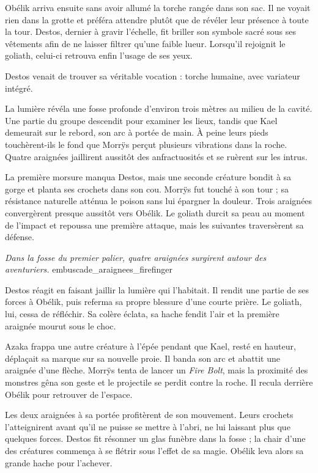 Obélik arriva ensuite sans avoir allumé la torche rangée dans son sac. Il ne voyait rien dans la grotte et préféra attendre plutôt que de révéler leur présence à toute la tour. Destos, dernier à gravir l'échelle, fit briller son symbole sacré sous ses vêtements afin de ne laisser filtrer qu'une faible lueur. Lorsqu'il rejoignit le goliath, celui-ci retrouva enfin l'usage de ses yeux.

\begin{narrateur}
Destos venait de trouver sa véritable vocation : torche humaine, avec variateur intégré.
\end{narrateur}

\scenebreak

La lumière révéla une fosse profonde d'environ trois mètres au milieu de la cavité. Une partie du groupe descendit pour examiner les lieux, tandis que Kael demeurait sur le rebord, son arc à portée de main. À peine leurs pieds touchèrent-ils le fond que Morrÿs perçut plusieurs vibrations dans la roche. Quatre araignées jaillirent aussitôt des anfractuosités et se ruèrent sur les intrus.

La première morsure manqua Destos, mais une seconde créature bondit à sa gorge et planta ses crochets dans son cou. Morrÿs fut touché à son tour ; sa résistance naturelle atténua le poison sans lui épargner la douleur. Trois araignées convergèrent presque aussitôt vers Obélik. Le goliath durcit sa peau au moment de l'impact et repoussa une première attaque, mais les suivantes traversèrent sa défense.

{\textit{Dans la fosse du premier palier, quatre araignées surgirent autour des aventuriers.}}
{embuscade_araignees_firefinger}

Destos réagit en faisant jaillir la lumière qui l'habitait. Il rendit une partie de ses forces à Obélik, puis referma sa propre blessure d'une courte prière. Le goliath, lui, cessa de réfléchir. Sa colère éclata, sa hache fendit l'air et la première araignée mourut sous le choc.

Azaka frappa une autre créature à l'épée pendant que Kael, resté en hauteur, déplaçait sa marque sur sa nouvelle proie. Il banda son arc et abattit une araignée d'une flèche. Morrÿs tenta de lancer un \textit{Fire Bolt}, mais la proximité des monstres gêna son geste et le projectile se perdit contre la roche. Il recula derrière Obélik pour retrouver de l'espace.

Les deux araignées à sa portée profitèrent de son mouvement. Leurs crochets l'atteignirent avant qu'il ne puisse se mettre à l'abri, ne lui laissant plus que quelques forces. Destos fit résonner un glas funèbre dans la fosse ; la chair d'une des créatures commença à se flétrir sous l'effet de sa magie. Obélik leva alors sa grande hache pour l'achever.

